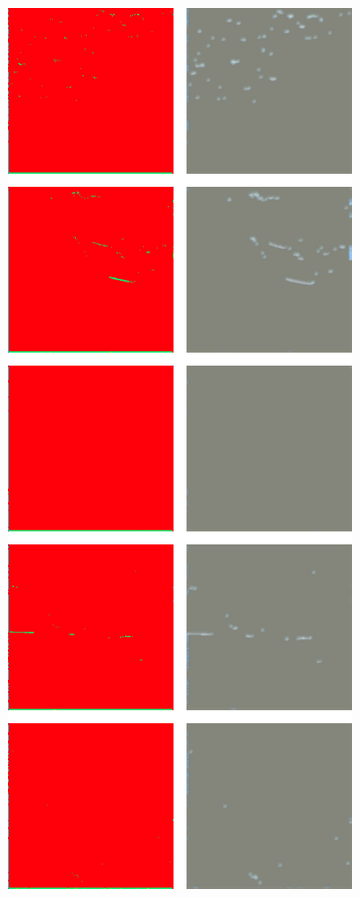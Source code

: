 \begin{figure}[h]
\begin{subfigure}{\WnetPredictionsImageWidth}
        \caption{}
        \label{fig:wnet_pred_36d-20}
    \end{subfigure} \hspace{3mm}
    \begin{subfigure}{\WnetPredictionsImageWidth}
        \includegraphics[width=\textwidth]{images/wnet/46d-20}
        \caption{}
        \label{fig:wnet_pred_46d-20}
    \end{subfigure}


\end{figure}
